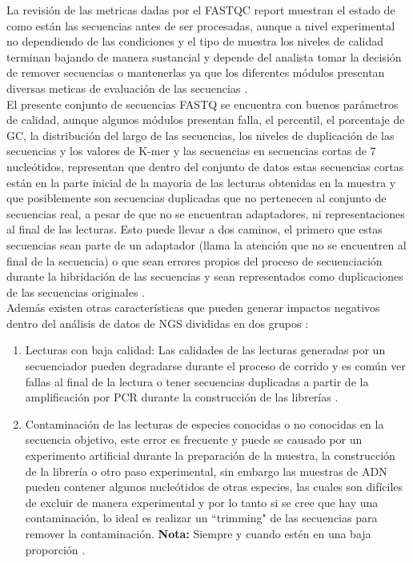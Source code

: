 La revisión de las metricas dadas por el FASTQC report muestran el estado de como están las secuencias antes de ser procesadas, aunque a nivel experimental no dependiendo de las condiciones y el tipo de muestra los niveles de calidad terminan bajando de manera sustancial y depende del analista tomar la decisión de remover secuencias o mantenerlas ya que los diferentes módulos presentan diversas meticas de evaluación de las secuencias \cite{Babraham2016}. \\

El presente conjunto de secuencias FASTQ se encuentra con buenos parámetros de calidad, aunque algunos módulos presentan falla, el percentil, el porcentaje de GC, la distribución del largo de las secuencias, los niveles de duplicación de las secuencias y los valores de K-mer y las secuencias en secuencias cortas de 7 nucleótidos, representan que dentro del conjunto de datos estas secuencias cortas están en la parte inicial de la mayoria de las lecturas obtenidas en la muestra y que posiblemente son secuencias duplicadas que no pertenecen al conjunto de secuencias real, a pesar de que no se encuentran adaptadores, ni representaciones al final de las lecturas. Esto puede llevar a dos caminos, el primero que estas secuencias sean parte de un adaptador (llama la atención que no se encuentren al final de la secuencia)  o que sean errores propios del proceso de secuenciación durante la hibridación de las secuencias y sean representados como duplicaciones de las secuencias originales \cite{Babraham2016}\cite{Pirooznia2014}. \\ 

Además existen otras características que pueden generar impactos negativos dentro del análisis de datos de NGS divididas en dos grupos \cite{Zhou2013}: 

\begin{enumerate}
	\item Lecturas con baja calidad: Las calidades de las lecturas generadas por un secuenciador pueden degradarse durante el proceso de corrido y es común ver fallas al final de la lectura o tener secuencias duplicadas a partir de la amplificación por PCR durante la construcción de las librerías \cite{Zhou2013}. 
	\item Contaminación de las lecturas de especies conocidas o no conocidas en la secuencia objetivo, este error es frecuente y puede se causado por un experimento artificial durante la preparación de la muestra, la construcción de la librería o otro paso experimental, sin embargo las muestras de ADN pueden contener algunos nucleótidos de otras especies, las cuales son difíciles de excluir de manera experimental y por lo tanto si se cree que hay una contaminación, lo ideal es realizar un ``trimming" de las secuencias para remover la contaminación. \textbf{Nota:} Siempre y cuando estén en una baja proporción \cite{Zhou2013}. 
\end{enumerate}

